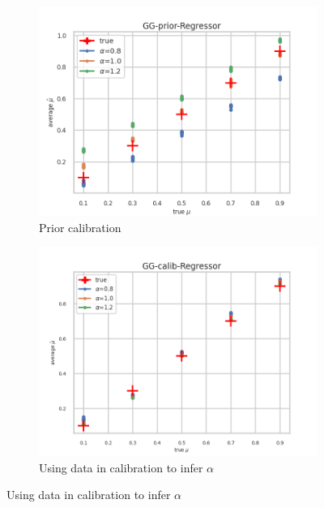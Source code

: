 \begin{figure}[ht!]
  \centering
  \begin{subfigure}[t]{0.49\linewidth}
    \includegraphics[width=\linewidth]{COMPARE/GG-prior/Regressor/profusion_true_mu_target_mean.png}
    \caption{Prior calibration}
  \end{subfigure}%
  \hfill
  \begin{subfigure}[t]{0.49\linewidth}
    \includegraphics[width=\linewidth]{COMPARE/GG-calib/Regressor/profusion_true_mu_target_mean.png}
    \caption{Using data in calibration to infer $\alpha$}
  \end{subfigure}


\end{figure}

